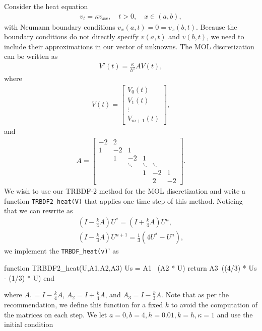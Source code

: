 \documentclass[12pt]{report}
\begin{document}
\begin{solution}
    
    \noindent
    Consider the heat equation
\begin{align*}
    v_t = \kappa v_{xx}, \quad t > 0,\quad x \in (a,b),
\end{align*}
    with Neumann boundary conditions $v_x(a,t) = 0 = v_x(b,t)$.  Because the boundary conditions do not directly specify $v(a,t)$ and $v(b,t)$, we need to include their approximations in our vector of unknowns. The MOL discretization can be written as
    \begin{align*}
    V'(t) = \frac{\kappa}{h^2} A V(t),
    \end{align*}
    where
    \begin{align*}
    V(t) = \begin{bmatrix} V_0(t)\\ V_1(t) \\ \vdots \\ V_{m+1}(t) \end{bmatrix},
    \end{align*}
    and 
    \begin{align*}
    A = \begin{bmatrix}
    -2  & 2\\
    1 & -2 & 1 \\
    & 1 & -2 & 1\\
    && \ddots & \ddots & \ddots \\
    &&& 1 & -2 & 1\\
    &&&& 2 & -2 \end{bmatrix}.
    \end{align*}
    We wish to use our TRBDF-2 method for the MOL discretization and write a function \verb`TRBDF2_heat(V)` that applies one time step of this method. Noticing that we can rewrite  as 
    \begin{align*}
    \left( I - \frac k 4 A \right)U^*  =  \left( I + \frac k 4 A \right) U^n,\\
    \left( I - \frac k 3 A \right) U^{n+1} = \frac 1 3 \left( 4 U^* - U^n \right),
    \end{align*}
    we implement the \verb`TRBDF_heat(v)`' as
    \begin{jllisting}
function TRBDF2_heat(U,A1,A2,A3)
    Us = A1 \ (A2 * U)
    return A3\ ((4/3) * Us - (1/3) * U)
end
    \end{jllisting}
    where $A_1 = I - \frac{k}{4}A$, $A_2 = I + \frac{k}{4}A$, and $A_3 = I - \frac{k}{3}A$. Note that as per the recommendation, we define this function for a fixed $k$ to avoid the computation of the matrices on each step. We let $a=0, b=4, h=0.01, k = h, \kappa = 1$ and use the initial condition

\end{solution}
\end{document}
